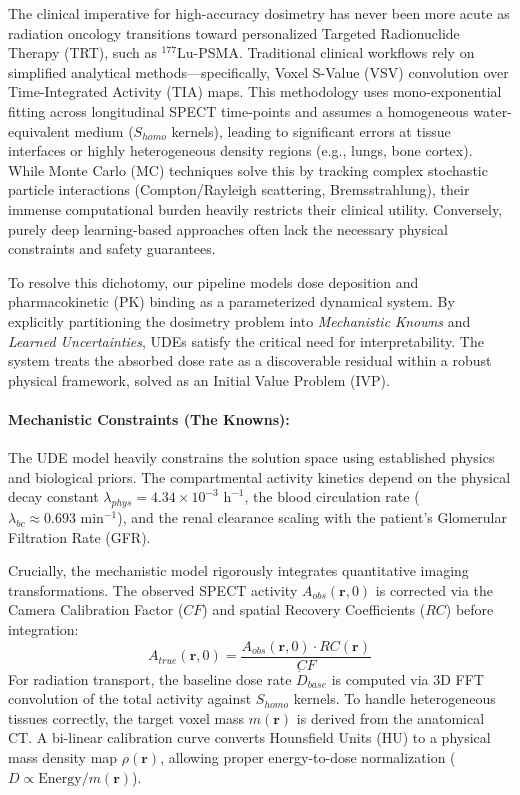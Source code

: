 \documentclass[10pt,letterpaper]{article}
\begin{document}
The clinical imperative for high-accuracy dosimetry has never been more acute as radiation oncology transitions toward personalized Targeted Radionuclide Therapy (TRT), such as $^{177}$Lu-PSMA. Traditional clinical workflows rely on simplified analytical methods---specifically, Voxel S-Value (VSV) convolution over Time-Integrated Activity (TIA) maps. This methodology uses mono-exponential fitting across longitudinal SPECT time-points and assumes a homogeneous water-equivalent medium ($S_{homo}$ kernels), leading to significant errors at tissue interfaces or highly heterogeneous density regions (e.g., lungs, bone cortex). While Monte Carlo (MC) techniques solve this by tracking complex stochastic particle interactions (Compton/Rayleigh scattering, Bremsstrahlung), their immense computational burden heavily restricts their clinical utility. Conversely, purely deep learning-based approaches often lack the necessary physical constraints and safety guarantees.

To resolve this dichotomy, our pipeline models dose deposition and pharmacokinetic (PK) binding as a parameterized dynamical system. By explicitly partitioning the dosimetry problem into \textit{Mechanistic Knowns} and \textit{Learned Uncertainties}, UDEs satisfy the critical need for interpretability. The system treats the absorbed dose rate as a discoverable residual within a robust physical framework, solved as an Initial Value Problem (IVP).

\paragraph{Mechanistic Constraints (The Knowns):} 
The UDE model heavily constrains the solution space using established physics and biological priors. The compartmental activity kinetics depend on the physical decay constant $\lambda_{phys} = 4.34 \times 10^{-3} \text{ h}^{-1}$, the blood circulation rate ($\lambda_{bc} \approx 0.693 \text{ min}^{-1}$), and the renal clearance scaling with the patient's Glomerular Filtration Rate (GFR). 

Crucially, the mechanistic model rigorously integrates quantitative imaging transformations. The observed SPECT activity $A_{obs}(\mathbf{r}, 0)$ is corrected via the Camera Calibration Factor ($CF$) and spatial Recovery Coefficients ($RC$) before integration:
\begin{equation}
    A_{true}(\mathbf{r}, 0) = \frac{A_{obs}(\mathbf{r}, 0) \cdot RC(\mathbf{r})}{CF}
\end{equation}
For radiation transport, the baseline dose rate $\dot{D}_{base}$ is computed via 3D FFT convolution of the total activity against $S_{homo}$ kernels. To handle heterogeneous tissues correctly, the target voxel mass $m(\mathbf{r})$ is derived from the anatomical CT. A bi-linear calibration curve converts Hounsfield Units (HU) to a physical mass density map $\rho(\mathbf{r})$, allowing proper energy-to-dose normalization ($D \propto \text{Energy} / m(\mathbf{r})$).
\end{document}
